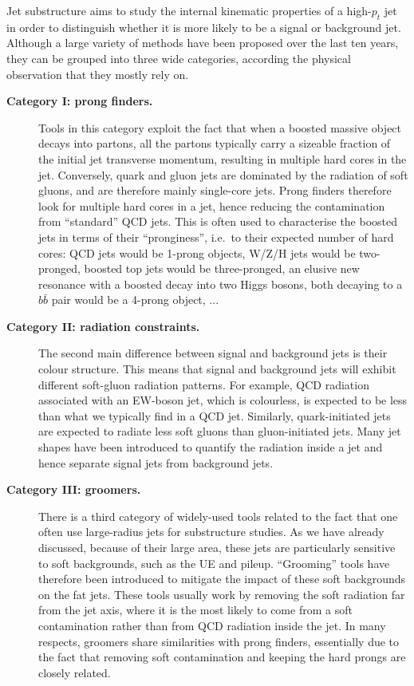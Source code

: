 Jet substructure aims to study the internal kinematic 
properties of a high-$p_t$ jet in order to distinguish whether it is more likely to be a signal or  background jet.
%
Although a large variety of methods have been proposed over the last
ten years, they can be grouped into three wide categories, according the physical observation that they mostly rely on.
\begin{description}
\item[{\bf Category I: prong finders.}]
  Tools in this category exploit the fact that when a boosted massive object decays
  into partons, all the partons typically carry a sizeable fraction of
  the initial jet transverse momentum, resulting in multiple hard
  cores in the jet. Conversely, quark and gluon jets are dominated by
  the radiation of soft gluons, and are therefore mainly single-core
  jets.
  Prong finders therefore look for multiple hard cores in a jet, hence
  reducing the contamination from ``standard'' QCD jets.
  This is often used to characterise the boosted jets in terms of their
  ``pronginess'', i.e.\ to their expected number of hard cores:
  QCD jets would be 1-prong objects, W/Z/H jets would be two-pronged,
  boosted top jets would be three-pronged, an elusive new resonance
  with a boosted decay into two Higgs bosons, both decaying to a
  $b\bar b$ pair would be a 4-prong object, ...
\item[{\bf Category II: radiation constraints.}]
  The second main difference between signal and background jets is
  their colour structure. This means that signal and background jets
  will exhibit different soft-gluon radiation patterns. For example, QCD radiation associated with 
  an EW-boson jet, which is colourless, is expected to be less than what we typically find in a QCD jet. 
  Similarly, quark-initiated jets are expected to radiate less
  soft gluons than gluon-initiated jets. Many jet shapes have been
  introduced to quantify the radiation inside a jet and hence separate
  signal jets from background jets.  
\item[{\bf Category III: groomers.}]
  There is a third category of widely-used tools related to the fact
  that one often use large-radius jets for
  substructure studies. As we have already discussed, because of their large area, these jets are particularly sensitive to soft backgrounds, such as the UE and pileup. ``Grooming'' tools have therefore been
  introduced to mitigate the impact of these soft backgrounds on the
  fat jets.
  These tools usually work by removing the soft radiation far from the
  jet axis, where it is the most likely to come from a soft
  contamination rather than from QCD radiation inside the jet.
  In many respects, groomers share similarities with prong finders,
  essentially due to the fact that removing soft contamination and
  keeping the hard prongs are closely related.
  \end{description}
